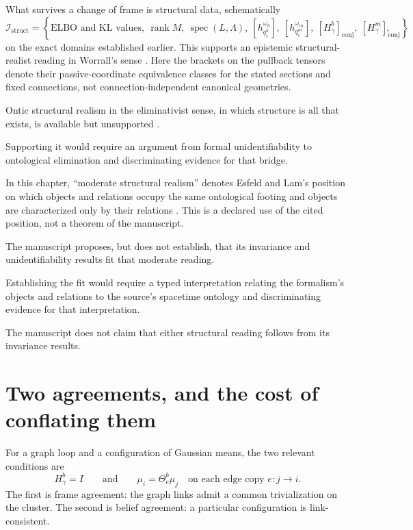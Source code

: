 What survives a change of frame is structural data, schematically
\begin{equation}
\mathcal I_{\mathrm{struct}}
=\left\{
\text{ELBO and KL values},\
\operatorname{rank}M,\
\operatorname{spec}(L,\Lambda),\
[h_{q_i^b}^{\omega_b}],\
[h_{q_i^m}^{\omega_m}],\
[H_\gamma^b]_{\mathrm{conj}},\
[H_\gamma^m]_{\mathrm{conj}}
\right\},
\label{eq:phil-invariants}
\end{equation}
on the exact domains established earlier.  This supports an epistemic
structural-realist reading in Worrall's sense \citep{Worrall1989}.
Here the brackets on the pullback tensors denote their passive-coordinate
equivalence classes for the stated sections and fixed connections, not
connection-independent canonical geometries. 

Ontic
structural realism in the eliminativist sense, in which structure is all that
exists, is available but unsupported \citep{Ladyman2007,Ladyman2014}.
\status{OPEN}

Supporting it would require an argument from formal
unidentifiability to ontological elimination and discriminating evidence for
that bridge. \status{OPEN}

In this chapter, ``moderate structural realism'' denotes Esfeld
and Lam's position on which objects and relations occupy the same ontological
footing and objects are characterized only by their relations
\citep{esfeld2008moderate}. This is a declared use of the cited position, not a
theorem of the manuscript. 

The manuscript proposes, but does not establish, that its
invariance and unidentifiability results fit that moderate reading.

Establishing the fit would require a typed interpretation
relating the formalism's objects and relations to the source's spacetime
ontology and discriminating evidence for that interpretation. \status{OPEN}

The manuscript does not claim that either structural reading follows from its
invariance results. 

\section{Two agreements, and the cost of conflating them}
\label{sec:phil-agreements}

For a graph loop and a configuration of Gaussian means, the two relevant
conditions are
\begin{equation}
H_\gamma^b=I
\qquad\text{and}\qquad
\mu_i=\Theta^b_e\mu_j\quad\text{on each edge copy }e:j\to i.
\label{eq:phil-two-agreements}
\end{equation}
The first is frame agreement: the graph links admit a common trivialization
on the cluster.  The second is belief agreement: a particular configuration
is link-consistent. 


